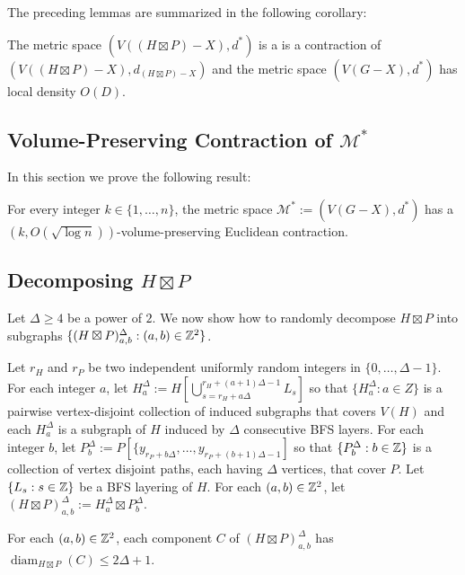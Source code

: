 \documentclass{patmorin}
\renewcommand{\ge}{\geqslant}
\renewcommand{\le}{\leqslant}
\DeclareMathOperator{\diam}{diam}
\begin{document}
The preceding lemmas are summarized in the following corollary:

\begin{cor}
  The metric space $(V((H\boxtimes P)-X), d^*)$ is a is a contraction of $(V((H\boxtimes P)-X), d_{(H\boxtimes P)-X})$ and the metric space $(V(G-X),d^*)$ has local density $O(D)$.
\end{cor}



\subsection{Volume-Preserving Contraction of $\mathcal{M}^*$}

In this section we prove the following result:

\begin{lem}\label{dstar_contraction}
  For every integer $k\in\{1,\ldots,n\}$, the metric space $\mathcal{M}^*:=(V(G-X),d^*)$ has a $(k,O(\sqrt{\log n}))$-volume-preserving Euclidean contraction. 
\end{lem}

\subsection{Decomposing $H\boxtimes P$}

Let $\Delta\ge 4$ be a power of $2$. We now show how to randomly decompose $H\boxtimes P$ into subgraphs $\{(H\boxtimes P)^\Delta_{a,b}:(a,b)\in\mathbb{Z}^2\}$.



Let $r_H$ and $r_P$ be two independent uniformly random integers in $\{0,\ldots,\Delta-1\}$. For each integer $a$, let $H^\Delta_a:=H[\bigcup_{s=r_H+a\Delta}^{r_H+(a+1)\Delta-1} L_s]$ so that $\{H^\Delta_a:a\in Z\}$ is a pairwise vertex-disjoint collection of induced subgraphs that covers $V(H)$ and each $H^\Delta_a$ is a subgraph of $H$ induced by $\Delta$ consecutive BFS layers. For each integer $b$, let $P^\Delta_b:=P[\{y_{r_P+b\Delta},\ldots,y_{r_P+(b+1)\Delta-1}]$ so that $\{P^\Delta_b:b\in\mathbb{Z}\}$ is a collection of vertex disjoint paths, each having $\Delta$ vertices, that cover $P$. Let $\{L_s:s\in\mathbb{Z}\}$ be a BFS layering of $H$.  For each $(a,b)\in\mathbb{Z}^2$, let $(H\boxtimes P)^\Delta_{a,b}:= H^\Delta_a \boxtimes P^\Delta_b$.

\begin{lem}\label{component_diameter}
  For each $(a,b)\in\mathbb{Z}^2$, each component $C$ of $(H\boxtimes P)^\Delta_{a,b}$ has $\diam_{H\boxtimes P}(C)\le 2\Delta+1$.
\end{lem}
\end{document}

